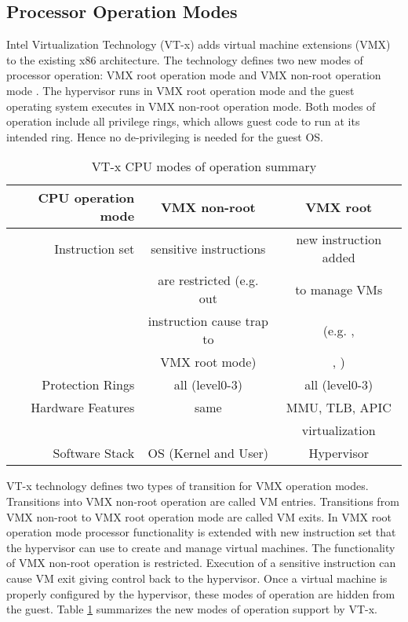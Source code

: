 \subsection{Processor Operation Modes}

Intel Virtualization Technology (VT-x) adds virtual machine extensions (VMX) to the existing x86 architecture.
The technology defines two new modes of processor operation: VMX root operation mode and VMX non-root operation mode \cite{intel-sdm-vol3}.
The hypervisor runs in VMX root operation mode and the guest operating system executes in VMX non-root operation mode.
Both modes of operation include all privilege rings, which allows guest code to run at its intended ring. 
Hence no de-privileging is needed for the guest OS.

\begin{table}[h!]
\centering
\begin{tabular}{|r|c|c|} 
\hline
	\textbf{CPU operation mode}	&	{\textbf{VMX non-root}} 	&	{\textbf{VMX root}} \\ \hline \hline
	Instruction set		&	sensitive instructions 		&  new instruction added \\
                        &	are restricted (e.g. out	&  to manage VMs \\ 
                        &	instruction cause trap to   & (e.g. \mVMLAUNCH{},  \\ 
                        &	VMX root mode)              & \mVMREAD{}, \mVMWRITE{}) \\ \hline      		 	         
	Protection Rings	&	all (level0-3)	&	all (level0-3) \\ \hline
    Hardware Features   &   same            &  MMU, TLB, APIC \\ 
						&                   &  virtualization \\ \hline
	Software Stack		&	OS (Kernel and User)	&	Hypervisor \\ \hline
\end{tabular}
\caption{VT-x CPU modes of operation summary} 
\label{cpu-modes-summary}
\end{table}


VT-x technology defines two types of transition for VMX operation modes. 
Transitions into VMX non-root operation are called VM entries. 
Transitions from VMX non-root to VMX root operation mode are called VM exits.
In VMX root operation mode processor functionality is extended with new instruction set that
the hypervisor can use to create and manage virtual machines.
The functionality of VMX non-root operation is restricted. 
Execution of a sensitive instruction can cause VM exit giving control back to the hypervisor.
Once a virtual machine is properly configured by the hypervisor, these modes of operation are hidden from the guest. 
Table \ref{cpu-modes-summary} summarizes the new modes of operation support by VT-x.


